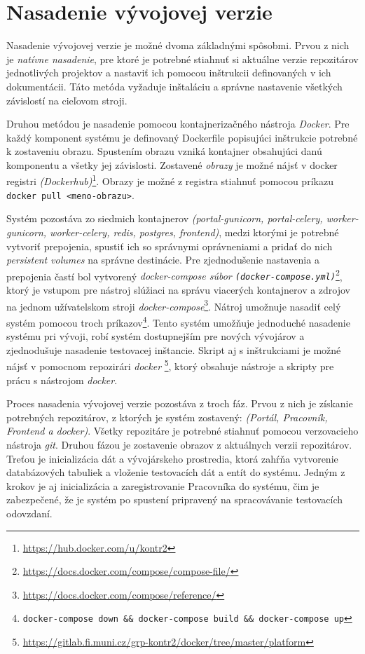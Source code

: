 \documentclass[
  digital, %
  twoside, %
  table,   %
  lof,     %
  lot,     %
]{fithesis3}
\begin{document}
\section{Nasadenie vývojovej verzie}

Nasadenie vývojovej verzie je možné dvoma základnými spôsobmi. Prvou z nich je \emph{natívne nasadenie}, pre ktoré je potrebné stiahnuť si aktuálne verzie repozitárov jednotlivých projektov a nastaviť ich pomocou inštrukcii definovaných v ich dokumentácii. Táto metóda vyžaduje inštaláciu a správne nastavenie všetkých závislostí na cieľovom stroji.

Druhou metódou je nasadenie pomocou kontajnerizačného nástroja \emph{Docker}. Pre každý komponent systému je definovaný Dockerfile popisujúci inštrukcie potrebné k zostaveniu obrazu. Spustením obrazu vzniká kontajner obsahujúci danú komponentu a všetky jej závislosti. Zostavené \emph{obrazy} je možné nájsť v docker registri \emph{(Dockerhub)}\footnote{\url{https://hub.docker.com/u/kontr2}}. Obrazy je možné z registra stiahnuť pomocou príkazu \texttt{docker pull <meno-obrazu>}.

Systém pozostáva zo siedmich kontajnerov \emph{(portal-gunicorn, portal-celery, worker-gunicorn, worker-celery, redis, postgres, frontend)}, medzi ktorými je potrebné vytvoriť prepojenia, spustiť ich so správnymi oprávneniami a pridať do nich \emph{persistent volumes} na správne destinácie. Pre zjednodušenie nastavenia a prepojenia častí bol vytvorený \emph{docker-compose súbor \texttt{(docker-compose.yml)}}\footnote{\url{https://docs.docker.com/compose/compose-file/}}, ktorý je vstupom pre nástroj slúžiaci na správu viacerých kontajnerov a zdrojov na jednom užívatelskom stroji \emph{docker-compose}\footnote{\url{https://docs.docker.com/compose/reference/}}. Nátroj umožnuje nasadiť celý systém pomocou troch príkazov\footnote{\texttt{docker-compose down \&\& docker-compose build \&\& docker-compose up}}. Tento systém umožňuje jednoduché nasadenie systému pri vývoji, robí systém dostupnejším pre nových vývojárov a zjednodušuje nasadenie testovacej inštancie. Skript aj s inštrukciami je možné nájsť v pomocnom repozirári \emph{docker} \footnote{\url{https://gitlab.fi.muni.cz/grp-kontr2/docker/tree/master/platform}}, ktorý obsahuje nástroje a skripty pre prácu s nástrojom \emph{docker}.

Proces nasadenia vývojovej verzie pozostáva z troch fáz. Prvou z nich je získanie potrebných repozitárov, z ktorých je systém zostavený: \emph{(Portál, Pracovník, Frontend a docker)}. Všetky repozitáre je potrebné stiahnuť pomocou verzovacieho nástroja \emph{git}. Druhou fázou je zostavenie obrazov z aktuálnych verzii repozitárov. Treťou je inicializácia dát a vývojárskeho prostredia, ktorá zahŕňa vytvorenie databázových tabuliek a vloženie testovacích dát a entít do systému. Jedným z krokov je aj inicializácia a zaregistrovanie Pracovníka do systému, čim je zabezpečené, že je systém po spustení pripravený na spracovávanie testovacích odovzdaní.
\end{document}
